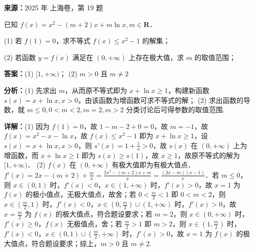 \begin{question}[points=14]
\textbf{来源：}2025 年 上海卷，第 19 题\par
已知 $f(x) = x^2 - (m+2)x + m\ln x, m \in \mathbf{R}$．

(1) 若 $f(1) = 0$，求不等式 $f(x) \leq x^2 - 1$ 的解集；

(2) 若函数 $y = f(x)$ 满足在 $(0, +\infty)$ 上存在极大值，求 $m$ 的取值范围；
\begin{solution}
\textbf{答案：}(1) $[1, +\infty)$； (2) $m > 0$ 且 $m \neq 2$

\textbf{分析：}(1) 先求出 $m$，从而原不等式即为 $x + \ln x \geq 1$，构建新函数 $s(x) = x + \ln x, x > 0$，由该函数为增函数可求不等式的解； (2) 求出函数的导数，就 $m \leq 0, 0 < m < 2, m = 2, m > 2$ 分类讨论后可得参数的取值范围.

\textbf{详解：}(1) 因为 $f(1) = 0$，故 $1 - m - 2 + 0 = 0$，故 $m = -1$，故 $f(x) = x^2 - x - \ln x$，故 $f(x) \leq x^2 - 1$ 即为 $x + \ln x \geq 1$，设 $s(x) = x + \ln x, x > 0$，则 $s'(x) = 1 + \frac{1}{x} > 0$，故 $s(x)$ 在 $(0, +\infty)$ 上为增函数，而 $x + \ln x \geq 1$ 即为 $s(x) \geq s(1)$，故 $x \geq 1$，故原不等式的解为 $[1, +\infty)$．
(2) $f(x)$ 在 $(0, +\infty)$ 有极大值即为有极大值点．$f'(x) = 2x - (m+2) + \frac{m}{x} = \frac{2x^2 - (m+2)x + m}{x} = \frac{(2x - m)(x - 1)}{x}$．若 $m \leq 0$，则 $x \in (0,1)$ 时，$f'(x) < 0$，$x \in (1, +\infty)$ 时，$f'(x) > 0$，故 $x = 1$ 为 $f(x)$ 的极小值点，无极大值点，故舍；若 $0 < \frac{m}{2} < 1$ 即 $0 < m < 2$，则 $x \in \left(\frac{m}{2}, 1\right)$ 时，$f'(x) < 0$，$x \in \left(0, \frac{m}{2}\right) \cup (1, +\infty)$ 时，$f'(x) > 0$，故 $x = \frac{m}{2}$ 为 $f(x)$ 的极大值点，符合题设要求；若 $m = 2$，则 $x \in (0, +\infty)$ 时，$f'(x) \geq 0$，$f(x)$ 无极值点，舍；若 $\frac{m}{2} > 1$ 即 $m > 2$，则 $x \in \left(1, \frac{m}{2}\right)$ 时，$f'(x) < 0$，$x \in (0,1) \cup \left(\frac{m}{2}, +\infty\right)$ 时，$f'(x) > 0$，故 $x = 1$ 为 $f(x)$ 的极大值点，符合题设要求；综上，$m > 0$ 且 $m \neq 2$.
\end{solution}
\end{question}

